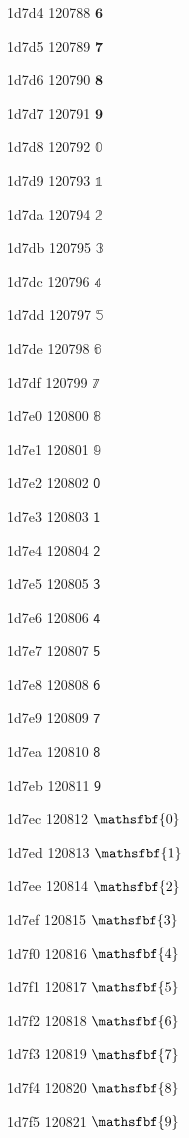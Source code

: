 \documentclass[11pt]{article}
\begin{document}
1d7d4 120788 \ensuremath{\mathbf{6}}

1d7d5 120789 \ensuremath{\mathbf{7}}

1d7d6 120790 \ensuremath{\mathbf{8}}

1d7d7 120791 \ensuremath{\mathbf{9}}

1d7d8 120792 \ensuremath{\mathbb{0}}

1d7d9 120793 \ensuremath{\mathbb{1}}

1d7da 120794 \ensuremath{\mathbb{2}}

1d7db 120795 \ensuremath{\mathbb{3}}

1d7dc 120796 \ensuremath{\mathbb{4}}

1d7dd 120797 \ensuremath{\mathbb{5}}

1d7de 120798 \ensuremath{\mathbb{6}}

1d7df 120799 \ensuremath{\mathbb{7}}

1d7e0 120800 \ensuremath{\mathbb{8}}

1d7e1 120801 \ensuremath{\mathbb{9}}

1d7e2 120802 \ensuremath{\mathsf{0}}

1d7e3 120803 \ensuremath{\mathsf{1}}

1d7e4 120804 \ensuremath{\mathsf{2}}

1d7e5 120805 \ensuremath{\mathsf{3}}

1d7e6 120806 \ensuremath{\mathsf{4}}

1d7e7 120807 \ensuremath{\mathsf{5}}

1d7e8 120808 \ensuremath{\mathsf{6}}

1d7e9 120809 \ensuremath{\mathsf{7}}

1d7ea 120810 \ensuremath{\mathsf{8}}

1d7eb 120811 \ensuremath{\mathsf{9}}

1d7ec 120812 \ensuremath{\mathsfbf{0}}

1d7ed 120813 \ensuremath{\mathsfbf{1}}

1d7ee 120814 \ensuremath{\mathsfbf{2}}

1d7ef 120815 \ensuremath{\mathsfbf{3}}

1d7f0 120816 \ensuremath{\mathsfbf{4}}

1d7f1 120817 \ensuremath{\mathsfbf{5}}

1d7f2 120818 \ensuremath{\mathsfbf{6}}

1d7f3 120819 \ensuremath{\mathsfbf{7}}

1d7f4 120820 \ensuremath{\mathsfbf{8}}

1d7f5 120821 \ensuremath{\mathsfbf{9}}
\end{document}
